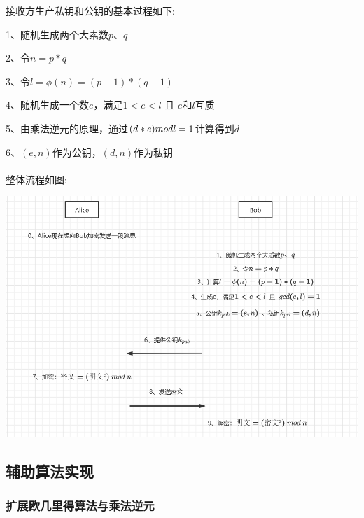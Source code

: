\documentclass[UTF8,a4paper,11pt]{ctexart}
\newcommand{\upcite}[1]{\textsuperscript{\textsuperscript{\cite{#1}}}}
\begin{document}
	\par 接收方生产私钥和公钥的基本过程如下: 
	\par 1、随机生成两个大素数$p、q$
	\par 2、令$n=p*q$
	\par 3、令$l=\phi(n)=(p-1)*(q-1)$
	\par 4、随机生成一个数$e$，满足$1<e<l$  且 $e$和$l$互质
	\par 5、由乘法逆元的原理，通过$(d*e)\space mod\space l=1$计算得到$d$
	\par 6、$(e,n)$作为公钥，$(d,n)$作为私钥

	\par 整体流程\upcite{2}如图:\\
	\centerline{\includegraphics[scale=0.6]{RSA流程.png}} 


\subsection{辅助算法实现}

\subsubsection {扩展欧几里得算法与乘法逆元}
\end{document}
